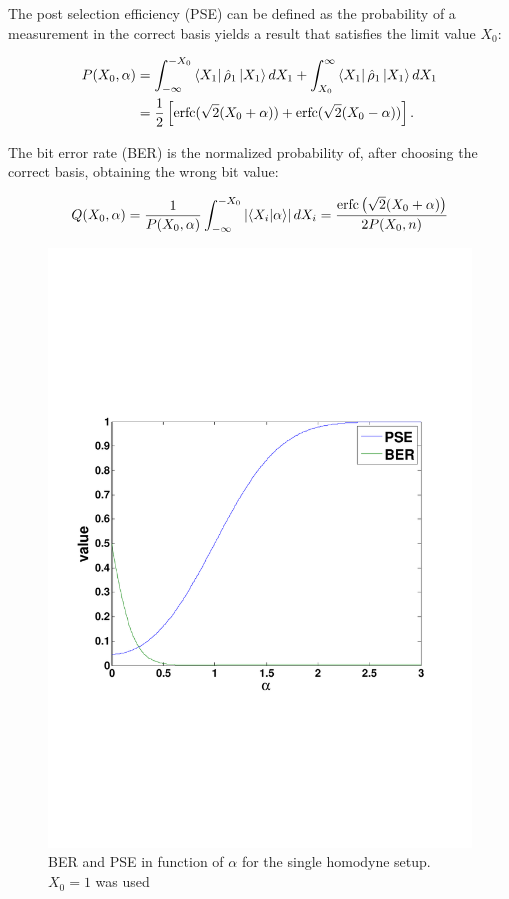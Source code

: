 \documentclass[a4paper]{article}
\begin{document}
The post selection efficiency (PSE) can be defined as the probability of a measurement in the correct basis yields a result that satisfies the limit value $X_0$:

\begin{equation}\label{eq:postselecteff}
\begin{aligned}
P(X_0,\alpha)&=\int^{-X_0}_{-\infty}\bra{X_1}\hat{\rho}_1\ket{X_1}dX_1+\int^{\infty}_{X_0}\bra{X_1}\hat{\rho}_1\ket{X_1}dX_1\\
&=\frac{1}{2}\left[\text{erfc}(\sqrt{2}(X_0+\alpha))+\text{erfc}(\sqrt{2}(X_0-\alpha))\right].
\end{aligned}
\end{equation}

The bit error rate (BER) is the normalized probability of, after choosing the correct basis, obtaining the wrong bit value:

\begin{equation}\label{eq:biterrorratio}
Q(X_0,\alpha)=\frac{1}{P(X_0,\alpha)}\int_{-\infty}^{-X_0}\left|\braket{X_i|\alpha}\right|dX_i=\frac{\text{erfc}\left(\sqrt{2}(X_0+\alpha)\right)}{2P(X_0,n)}
\end{equation}

\begin{figure}[h]
\centering
\includegraphics[width=\linewidth, trim= 0mm 60mm 0mm 70mm]{singlehomodyne.pdf}
\caption{BER and PSE in function of $\alpha$ for the single homodyne setup. $X_0=1$ was used}
\label{fig:ber}
\end{figure}
\end{document}
